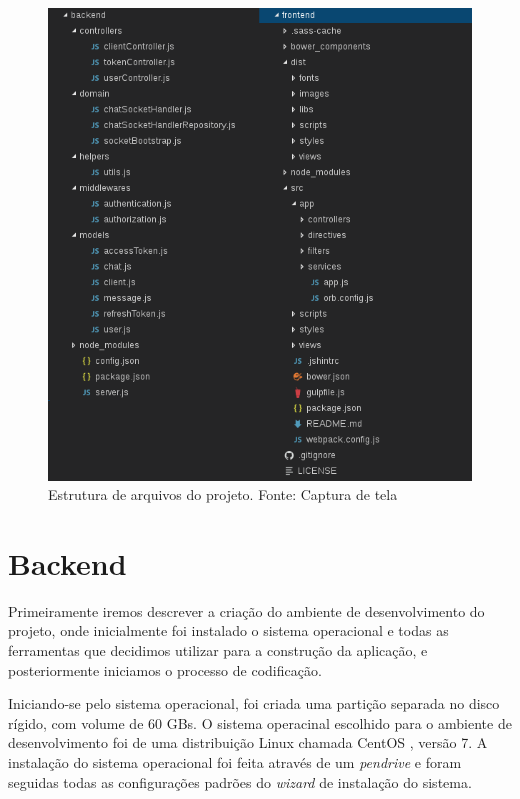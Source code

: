 \begin{figure}[H]
	\centering
	\includegraphics[scale=0.75]{imagens/estrutura_arquivos.png}
	\caption{\small Estrutura de arquivos do projeto. Fonte: Captura de tela}
	\label{fig:estrutura-arquivos}
\end{figure}

\section{Backend}
Primeiramente iremos descrever a criação do ambiente de desenvolvimento do projeto, onde inicialmente foi instalado o sistema operacional e todas as ferramentas que decidimos utilizar para a construção da aplicação, e posteriormente iniciamos o processo de codificação.

Iniciando-se pelo sistema operacional, foi criada uma partição separada no disco rígido, com volume de 60 GBs. O sistema operacinal escolhido para o ambiente de desenvolvimento foi de uma distribuição Linux chamada CentOS \cite{centos}, versão 7. A instalação do sistema operacional foi feita através de um \textit{pendrive} e foram seguidas todas as configurações padrões do \textit{wizard} de instalação do sistema.

